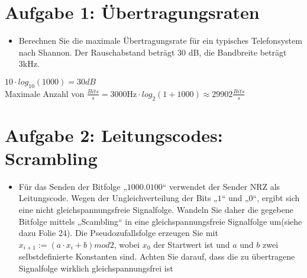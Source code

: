 \section{Aufgabe 1: Übertragungsraten}
	\begin{itemize}
		\item Berechnen Sie die maximale Übertragungsrate für ein typisches Telefonsystem nach Shannon. Der Rauschabstand beträgt 30 dB, die Bandbreite beträgt 3kHz.
	\end{itemize}
	$10 \cdot log_{10}(1000)=30 dB$
	\\Maximale Anzahl von $\frac{Bits}{s} =3000\text{Hz} \cdot log_{2}(1+1000)  \approx 29902 \frac{Bits}{s}$


\section{Aufgabe 2: Leitungscodes: Scrambling}
	\begin{itemize}
		\item Für das Senden der Bitfolge „$1000.0100$“ verwendet der Sender NRZ als Leitungscode. Wegen der Ungleichverteilung der Bits „$1$“ und „$0$“, ergibt sich eine nicht gleichspannungsfreie Signalfolge.
		Wandeln Sie daher die gegebene Bitfolge mittels „Scambling“ in eine gleichspannungsfreie Signalfolge um(siehe dazu Folie 24).
		Die Pseudozufallsfolge erzeugen Sie mit $x_{i+1} := (a \cdot x_i+ b) mod 2$, wobei $x_0$ der Startwert ist und $a$ und $b$ zwei selbstdefinierte Konstanten sind. 
		Achten Sie darauf, dass die zu übertragene Signalfolge wirklich gleichspannungsfrei ist
	\end{itemize}